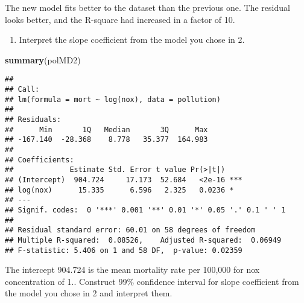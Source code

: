 \documentclass[]{article}
\newenvironment{Shaded}{\begin{snugshade}}{\end{snugshade}}
\newcommand{\DataTypeTok}[1]{\textcolor[rgb]{0.13,0.29,0.53}{#1}}
\newcommand{\DecValTok}[1]{\textcolor[rgb]{0.00,0.00,0.81}{#1}}
\newcommand{\FloatTok}[1]{\textcolor[rgb]{0.00,0.00,0.81}{#1}}
\newcommand{\KeywordTok}[1]{\textcolor[rgb]{0.13,0.29,0.53}{\textbf{#1}}}
\newcommand{\NormalTok}[1]{#1}
\newcommand{\OperatorTok}[1]{\textcolor[rgb]{0.81,0.36,0.00}{\textbf{#1}}}
\newcommand{\StringTok}[1]{\textcolor[rgb]{0.31,0.60,0.02}{#1}}
\providecommand{\tightlist}{%
  \setlength{\itemsep}{0pt}\setlength{\parskip}{0pt}}
\begin{document}
The new model fits better to the dataset than the previous one. The
residual looks better, and the R-square had increased in a factor of
10.\newline

\begin{enumerate}
\def\labelenumi{\arabic{enumi}.}
\setcounter{enumi}{2}
\tightlist
\item
  Interpret the slope coefficient from the model you chose in 2.
\end{enumerate}

\begin{Shaded}
\begin{Highlighting}[]
\KeywordTok{summary}\NormalTok{(polMD2)}
\end{Highlighting}
\end{Shaded}

\begin{verbatim}
## 
## Call:
## lm(formula = mort ~ log(nox), data = pollution)
## 
## Residuals:
##      Min       1Q   Median       3Q      Max 
## -167.140  -28.368    8.778   35.377  164.983 
## 
## Coefficients:
##             Estimate Std. Error t value Pr(>|t|)    
## (Intercept)  904.724     17.173  52.684   <2e-16 ***
## log(nox)      15.335      6.596   2.325   0.0236 *  
## ---
## Signif. codes:  0 '***' 0.001 '**' 0.01 '*' 0.05 '.' 0.1 ' ' 1
## 
## Residual standard error: 60.01 on 58 degrees of freedom
## Multiple R-squared:  0.08526,    Adjusted R-squared:  0.06949 
## F-statistic: 5.406 on 1 and 58 DF,  p-value: 0.02359
\end{verbatim}

The intercept 904.724 is the mean mortality rate per 100,000 for nox
concentration of 1.. Construct 99\% confidence interval for
slope coefficient from the model you chose in 2 and interpret them.

\begin{Shaded}
\end{Shaded}
\end{document}
